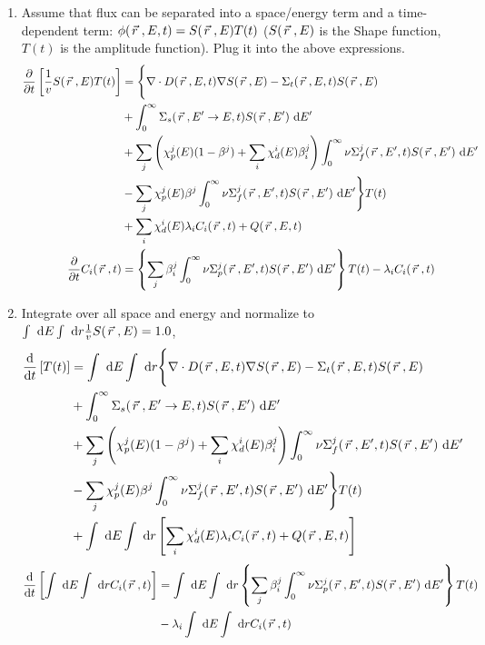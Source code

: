\documentclass{school-22.211-notes}
\begin{document}
\begin{enumerate}
\item Assume that flux can be separated into a space/energy term and a time-dependent term: $\phi(\vecr, E, t) = S(\vecr, E) T(t)$ ($S(\vecr, E)$ is the Shape function,  $T(t)$ is the amplitude function). Plug it into the above expressions. 
  \begin{align}
    \ppt \left[ \frac{1}{v} S(\vecr, E) T(t) \right] &= 
    \Bigg\{ \divergence D(\vecr, E, t) \gradient S(\vecr, E) - \Sigma_t (\vecr, E, t) S(\vecr, E)   \notag \\
    & + \int_0^{\infty} \Sigma_s (\vecr, E'\to E, t) S(\vecr, E') \dE'   \notag \\
    &+ \Sum_j \left( \chi_p^j (E) (1-\beta^j) + \Sum_i \chi_d^i (E) \beta_i^j \right) \int_0^{\infty} \nu \Sigma_f^j (\vecr, E', t) S(\vecr, E') \dE'   \notag \\
    &- \Sum_j \chi_p^j (E) \beta^j \int_0^{\infty} \nu \Sigma_f^j (\vecr, E', t) S(\vecr, E') \dE' \Bigg\} T(t)  \notag \\
    &+ \Sum_i \chi_d^i (E) \lambda_i C_i (\vecr, t) + Q(\vecr, E, t)   \\
    \ppt C_i (\vecr, t) &= \left\{ \Sum_j \beta_i^j \int_0^{\infty} \nu \Sigma_p^j (\vecr, E', t) S(\vecr, E') \dE' \right\} T(t) - \lambda_i C_i (\vecr, t) 
  \end{align}


\clearpage
\item Integrate over all space and energy and normalize to $\int \dE \int \dr \frac{1}{v} S(\vecr, E) = 1.0$, 
  \begin{align}
    \ddt \left[ T(t) \right] &= 
    \int \dE \int \dr \Bigg\{ \divergence D(\vecr, E, t) \gradient S(\vecr, E) - \Sigma_t (\vecr, E, t) S(\vecr, E)   \notag \\
    & + \int_0^{\infty} \Sigma_s (\vecr, E'\to E, t) S(\vecr, E') \dE'   \notag \\
    &+ \Sum_j \left( \chi_p^j (E) (1-\beta^j) + \Sum_i \chi_d^i (E) \beta_i^j \right) \int_0^{\infty} \nu \Sigma_f^j (\vecr, E', t) S(\vecr, E') \dE'   \notag \\
    &- \Sum_j \chi_p^j (E) \beta^j \int_0^{\infty} \nu \Sigma_f^j (\vecr, E', t) S(\vecr, E') \dE' \Bigg\} T(t)  \notag \\
    &+ \int \dE \int \dr \left[ \Sum_i \chi_d^i (E) \lambda_i C_i (\vecr, t) + Q(\vecr, E, t)\right]   
  \end{align}
  \begin{align}
    \ddt \left[ \int \dE \int \dr C_i (\vecr, t) \right] &= \int \dE \int \dr \left\{ \Sum_j \beta_i^j \int_0^{\infty} \nu \Sigma_p^j (\vecr, E', t) S(\vecr, E') \dE' \right\} T(t) \notag \\
    &- \lambda_i \int \dE \int \dr C_i (\vecr, t) 
  \end{align}



\end{enumerate}
\end{document}
